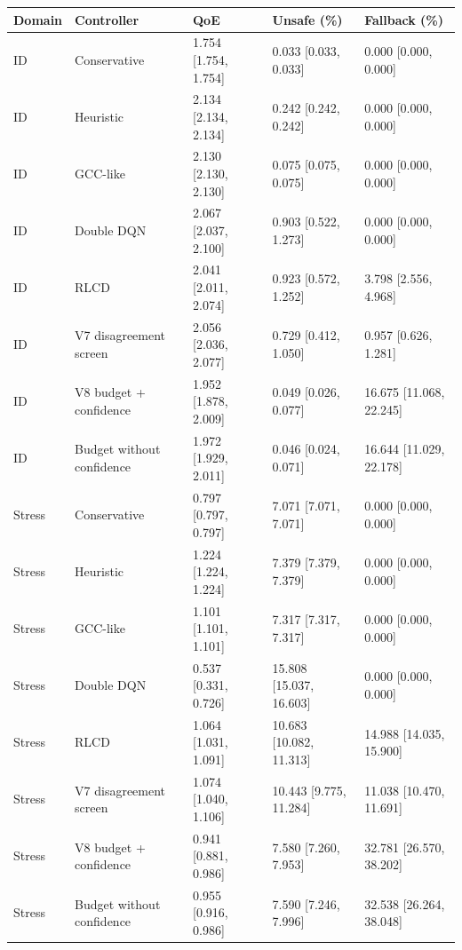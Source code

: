 \begin{tabular}{lllll}
\toprule
Domain & Controller & QoE & Unsafe (\%) & Fallback (\%) \\
\midrule
ID & Conservative & 1.754 [1.754, 1.754] & 0.033 [0.033, 0.033] & 0.000 [0.000, 0.000] \\
ID & Heuristic & 2.134 [2.134, 2.134] & 0.242 [0.242, 0.242] & 0.000 [0.000, 0.000] \\
ID & GCC-like & 2.130 [2.130, 2.130] & 0.075 [0.075, 0.075] & 0.000 [0.000, 0.000] \\
ID & Double DQN & 2.067 [2.037, 2.100] & 0.903 [0.522, 1.273] & 0.000 [0.000, 0.000] \\
ID & RLCD & 2.041 [2.011, 2.074] & 0.923 [0.572, 1.252] & 3.798 [2.556, 4.968] \\
ID & V7 disagreement screen & 2.056 [2.036, 2.077] & 0.729 [0.412, 1.050] & 0.957 [0.626, 1.281] \\
ID & V8 budget + confidence & 1.952 [1.878, 2.009] & 0.049 [0.026, 0.077] & 16.675 [11.068, 22.245] \\
ID & Budget without confidence & 1.972 [1.929, 2.011] & 0.046 [0.024, 0.071] & 16.644 [11.029, 22.178] \\
Stress & Conservative & 0.797 [0.797, 0.797] & 7.071 [7.071, 7.071] & 0.000 [0.000, 0.000] \\
Stress & Heuristic & 1.224 [1.224, 1.224] & 7.379 [7.379, 7.379] & 0.000 [0.000, 0.000] \\
Stress & GCC-like & 1.101 [1.101, 1.101] & 7.317 [7.317, 7.317] & 0.000 [0.000, 0.000] \\
Stress & Double DQN & 0.537 [0.331, 0.726] & 15.808 [15.037, 16.603] & 0.000 [0.000, 0.000] \\
Stress & RLCD & 1.064 [1.031, 1.091] & 10.683 [10.082, 11.313] & 14.988 [14.035, 15.900] \\
Stress & V7 disagreement screen & 1.074 [1.040, 1.106] & 10.443 [9.775, 11.284] & 11.038 [10.470, 11.691] \\
Stress & V8 budget + confidence & 0.941 [0.881, 0.986] & 7.580 [7.260, 7.953] & 32.781 [26.570, 38.202] \\
Stress & Budget without confidence & 0.955 [0.916, 0.986] & 7.590 [7.246, 7.996] & 32.538 [26.264, 38.048] \\
\bottomrule
\end{tabular}
